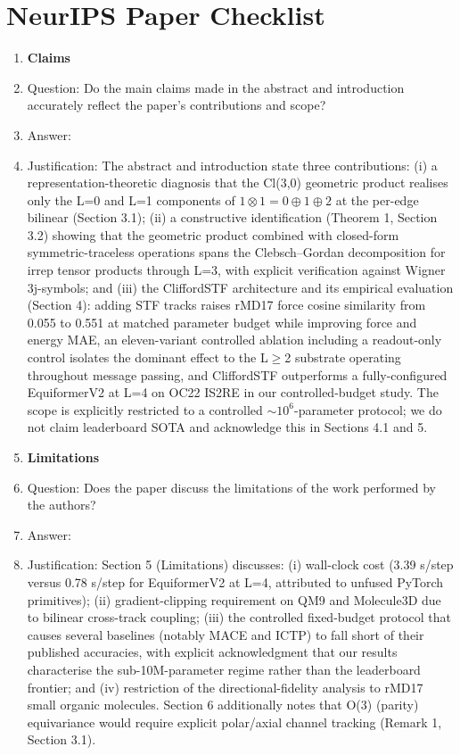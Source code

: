 \section*{NeurIPS Paper Checklist}

\begin{enumerate}

\item {\bf Claims}
    \item[] Question: Do the main claims made in the abstract and introduction accurately reflect the paper's contributions and scope?
    \item[] Answer: \answerYes{}
    \item[] Justification: The abstract and introduction state three contributions: (i) a representation-theoretic diagnosis that the Cl(3,0) geometric product realises only the L=0 and L=1 components of $1\otimes 1 = 0\oplus 1\oplus 2$ at the per-edge bilinear (Section 3.1); (ii) a constructive identification (Theorem 1, Section 3.2) showing that the geometric product combined with closed-form symmetric-traceless operations spans the Clebsch--Gordan decomposition for irrep tensor products through L=3, with explicit verification against Wigner 3j-symbols; and (iii) the CliffordSTF architecture and its empirical evaluation (Section 4): adding STF tracks raises rMD17 force cosine similarity from 0.055 to 0.551 at matched parameter budget while improving force and energy MAE, an eleven-variant controlled ablation including a readout-only control isolates the dominant effect to the L$\geq$2 substrate operating throughout message passing, and CliffordSTF outperforms a fully-configured EquiformerV2 at L=4 on OC22 IS2RE in our controlled-budget study. The scope is explicitly restricted to a controlled $\sim 10^6$-parameter protocol; we do not claim leaderboard SOTA and acknowledge this in Sections 4.1 and 5.

\item {\bf Limitations}
    \item[] Question: Does the paper discuss the limitations of the work performed by the authors?
    \item[] Answer: \answerYes{}
    \item[] Justification: Section 5 (Limitations) discusses: (i) wall-clock cost (3.39 s/step versus 0.78 s/step for EquiformerV2 at L=4, attributed to unfused PyTorch primitives); (ii) gradient-clipping requirement on QM9 and Molecule3D due to bilinear cross-track coupling; (iii) the controlled fixed-budget protocol that causes several baselines (notably MACE and ICTP) to fall short of their published accuracies, with explicit acknowledgment that our results characterise the sub-10M-parameter regime rather than the leaderboard frontier; and (iv) restriction of the directional-fidelity analysis to rMD17 small organic molecules. Section 6 additionally notes that O(3) (parity) equivariance would require explicit polar/axial channel tracking (Remark 1, Section 3.1).


\end{enumerate}
